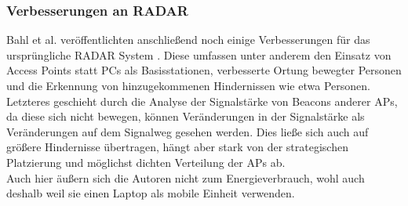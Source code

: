 \subsubsection{Verbesserungen an RADAR}
Bahl et al. veröffentlichten anschließend noch einige Verbesserungen für das ursprüngliche RADAR System \cite{bahl2000enhancements}.
Diese umfassen unter anderem den Einsatz von Access Points statt PCs als Basisstationen, verbesserte Ortung bewegter Personen und die Erkennung von hinzugekommenen Hindernissen wie etwa Personen.
Letzteres geschieht durch die Analyse der Signalstärke von Beacons anderer APs, da diese sich nicht bewegen, können Veränderungen in der Signalstärke als Veränderungen auf dem Signalweg gesehen werden.
Dies ließe sich auch auf größere Hindernisse übertragen, hängt aber stark von der strategischen Platzierung und möglichst dichten Verteilung der APs ab.\\
Auch hier äußern sich die Autoren nicht zum Energieverbrauch, wohl auch deshalb weil sie einen Laptop als mobile Einheit verwenden.

